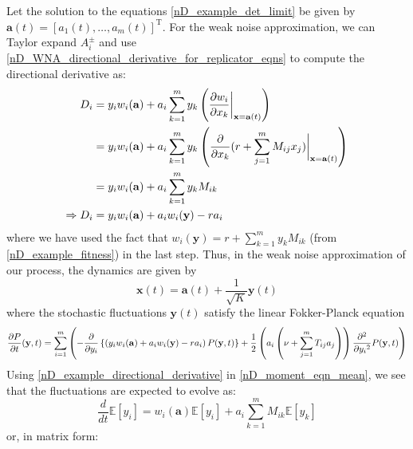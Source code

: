 Let the solution to the equations \eqref{nD_example_det_limit} be given by $\mathbf{a}(t) = [a_1(t),\ldots,a_m(t)]^{\mathrm{T}}$. For the weak noise approximation, we can Taylor expand $A^{\pm}_i$ and use \eqref{nD_WNA_directional_derivative_for_replicator_eqns} to compute the directional derivative as:
\begin{align}
D_i &= y_iw_i(\mathbf{a}) + a_i\sum\limits_{k=1}^{m}y_k\left(\frac{\partial w_i}{\partial x_k}\bigg{|}_{\mathbf{x}=\mathbf{a}(t)}\right)\\
&= y_iw_i(\mathbf{a}) + a_i\sum\limits_{k=1}^{m}y_k\left(\frac{\partial}{\partial x_k}(r+\sum\limits_{j=1}^{m}M_{ij}x_j)\bigg{|}_{\mathbf{x}=\mathbf{a}(t)}\right)\\
&= y_iw_i(\mathbf{a}) + a_i\sum\limits_{k=1}^{m}y_kM_{ik}\\
\Rightarrow D_i &= y_iw_i(\mathbf{a}) + a_iw_i(\mathbf{y}) - ra_i\label{nD_example_directional_derivative}
\end{align}
where we have used the fact that $w_i(\mathbf{y}) = r + \sum\limits_{k=1}^{m}y_kM_{ik}$ (from \eqref{nD_example_fitness}) in the last step. Thus, in the weak noise approximation of our process, the dynamics are given by
\begin{equation}
\mathbf{x}(t) = \mathbf{a}(t) + \frac{1}{\sqrt{K}}\mathbf{y}(t)
\end{equation}
where the stochastic fluctuations $\mathbf{y}(t)$ satisfy the linear Fokker-Planck equation
\begin{equation}
\resizebox{1.1\textwidth}{!}{$\displaystyle\frac{\partial P}{\partial t}(\mathbf{y},t) = \sum\limits_{i=1}^{m}\left(-\frac{\partial}{\partial y_i}\left\{\left(y_iw_i(\mathbf{a}) + a_iw_i(\mathbf{y}) - ra_i\right)P(\mathbf{y},t)\right\}+\frac{1}{2}\left(a_i\left(\nu + \sum\limits_{j=1}^{m}T_{ij}a_j\right)\right)\frac{\partial^2}{\partial{y_i}^2}P(\mathbf{y},t)\right)$}
\end{equation}
Using \eqref{nD_example_directional_derivative} in \eqref{nD_moment_eqn_mean}, we see that the fluctuations are expected to evolve as:
\begin{equation}
\label{nD_example_moment_eqn_mean}
\frac{d}{dt}\mathbb{E}[y_i] = w_i(\mathbf{a})\mathbb{E}[y_i] + a_i\sum\limits_{k=1}^{m}M_{ik}\mathbb{E}[y_k]
\end{equation}
or, in matrix form:
